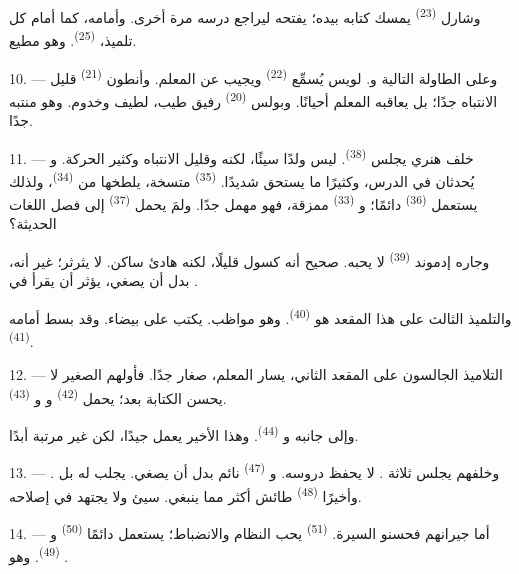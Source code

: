 وشارل \textsuperscript{(23)} يمسك كتابه بيده؛ يفتحه ليراجع درسه مرة أخرى. وأمامه،
كما أمام كل تلميذ،  \textsuperscript{(25)}. وهو مطيع.

10. --- وعلى الطاولة التالية  و. لويس
يُسمِّع  \textsuperscript{(22)} ويجيب عن  المعلم.
وأنطون \textsuperscript{(21)} قليل الانتباه جدًا؛ بل يعاقبه المعلم أحيانًا. وبولس
\textsuperscript{(20)} رفيق طيب، لطيف وخدوم. وهو منتبه جدًا.

\VUsaut{4.2mm}
\VUsaut{3.2mm}

11. --- خلف هنري يجلس  \textsuperscript{(38)}. ليس ولدًا سيئًا،
لكنه  وقليل الانتباه وكثير الحركة. 
و يُحدثان  في الدرس، وكثيرًا ما يستحق
 شديدًا.  \textsuperscript{(35)} متسخة، يلطخها
 من  \textsuperscript{(34)}، ولذلك يستعمل
 \textsuperscript{(36)} دائمًا؛ و \textsuperscript{(33)}
ممزقة، فهو مهمل جدًا. ولمَ يحمل  \textsuperscript{(37)} إلى
فصل اللغات الحديثة؟

وجاره إدموند \textsuperscript{(39)} لا يحبه. صحيح أنه كسول قليلًا، لكنه هادئ
ساكن. لا يثرثر؛ غير أنه، بدل أن يصغي، يؤثر أن يقرأ  في
.

والتلميذ الثالث على هذا المقعد هو  \textsuperscript{(40)}. وهو
مواظب. يكتب على  بيضاء. وقد بسط أمامه 
\textsuperscript{(41)}.

12. --- التلاميذ الجالسون على المقعد الثاني، يسار المعلم، صغار جدًا.
فأولهم  الصغير لا يحسن الكتابة بعد؛ يحمل 
\textsuperscript{(42)} و و \textsuperscript{(43)}.

وإلى جانبه  و \textsuperscript{(44)}. وهذا الأخير
يعمل جيدًا، لكن  غير مرتبة أبدًا.

13. --- وخلفهم يجلس ثلاثة .  لا يحفظ دروسه.
و \textsuperscript{(47)} نائم بدل أن يصغي.  يجلب له
 بل . وأخيرًا 
\textsuperscript{(48)} طائش أكثر مما ينبغي.  سيئ ولا يجتهد في
إصلاحه.

14. --- أما جيرانهم فحسنو السيرة.  \textsuperscript{(51)} يحب
النظام والانضباط؛ يستعمل دائمًا  \textsuperscript{(50)}
و \textsuperscript{(49)}. وهو .

